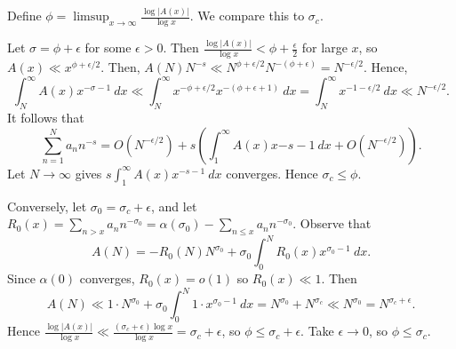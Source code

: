\documentclass[11pt]{article}
\theoremstyle{definition}
\newcommand{\s}[0]{\sigma}
\newcommand{\e}[0]{\epsilon}
\newcommand{\abs}[1]{\left\lvert#1\right\rvert} %
\begin{document}
Define $\phi=\limsup_{x\to\infty}\frac{\log\abs{A(x)}}{\log x}$. We compare this to $\s_c$.

Let $\s=\phi+\epsilon$ for some $\e>0$. Then $\frac{\log\abs{A(x)}}{\log x}<\phi+\frac\e2$
for large $x$, so $A(x)\ll x^{\phi+\e/2}$. Then, $A(N)N^{-s}\ll N^{\phi+\e/2}N^{-(\phi+\e)}
= N^{-\e/2}$. Hence,
\[
  \int_N^\infty A(x)x^{-\s-1} ~dx \ll \int_N^\infty x^{-\phi+\e/2}x^{-(\phi+\e+1)} ~dx
  = \int_N^\infty x^{-1-\e/2} ~dx \ll N^{-\e/2} .
\]
It follows that
\[
  \sum_{n=1}^N a_nn^{-s}
  = O(N^{-\e/2}) + s\left(\int_1^\infty A(x)x{-s-1} ~dx + O(N^{-\e/2})\right) .
\]
Let $N\to\infty$ gives $s\int_1^\infty A(x)x^{-s-1} ~dx$ converges. Hence
$\sigma_c\le\phi$.

Conversely, let $\s_0=\s_c+\e$, and let
$R_0(x)=\sum_{n>x}a_nn^{-\s_0}=\alpha(\s_0)-\sum_{n\le x}a_nn^{-\s_0}$. Observe that
\[
  A(N) = -R_0(N)N^{\s_0} + \s_0\int_0^NR_0(x)x^{\s_0-1} ~dx .
\]
Since $\alpha(0)$ converges, $R_0(x)=o(1)$ so $R_0(x)\ll1$. Then
\[
  A(N) \ll 1 \cdot N^{\s_0} + \s_0\int_0^N 1\cdot x^{\s_0-1} ~dx
  = N^{\s_0}+N^{\s_c} \ll N^{\s_0} = N^{\s_c+\e} .
\]
Hence $\frac{\log\abs{A(x)}}{\log x} \ll \frac{(\s_c+\e)\log x}{\log x} = \s_c+\e$, so
$\phi\le\s_c+\e$. Take $\e\to0$, so $\phi\le\s_c$.
\qedhere


\end{document}
